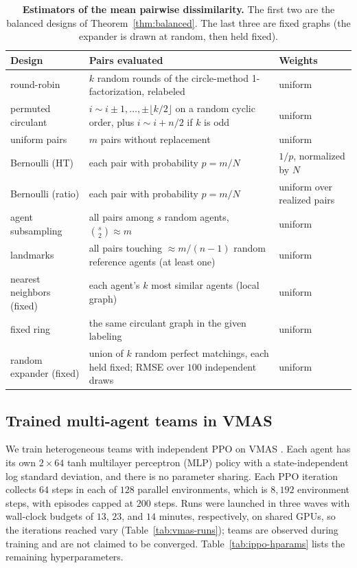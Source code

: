 \begin{table}[ht]
\centering
\small
\caption{\textbf{Estimators of the mean pairwise dissimilarity.} The first two are the
balanced designs of Theorem~\ref{thm:balanced}. The last three are fixed graphs (the expander is drawn at random, then held fixed).}
\label{tab:design-list}
\begin{tabular}{@{}>{\raggedright\arraybackslash}p{3.2cm}>{\raggedright\arraybackslash}p{7.6cm}>{\raggedright\arraybackslash}p{3.4cm}@{}}
\toprule
Design & Pairs evaluated & Weights \\
\midrule
round-robin & $k$ random rounds of the circle-method \mbox{1-factorization}, relabeled & uniform \\
permuted circulant & $i\sim i\pm1,\dots,\pm\lfloor k/2\rfloor$ on a random cyclic order, plus $i\sim i+n/2$ if $k$ is odd & uniform \\
uniform pairs & $m$ pairs without replacement & uniform \\
Bernoulli (HT) & each pair with probability $p=m/N$ & $1/p$, normalized by $N$ \\
Bernoulli (ratio) & each pair with probability $p=m/N$ & uniform over realized pairs \\
agent subsampling & all pairs among $s$ random agents, $\binom s2\approx m$ & uniform \\
landmarks & all pairs touching $\approx m/(n-1)$ random reference agents (at least one) & uniform \\
nearest neighbors (fixed) & each agent's $k$ most similar agents (local graph) & uniform \\
fixed ring & the same circulant graph in the given labeling & uniform \\
random expander (fixed) & union of $k$ random perfect matchings, each held fixed; RMSE over $100$ independent draws & uniform \\
\bottomrule
\end{tabular}
\end{table}

\subsection{Trained multi-agent teams in VMAS}
\label{app:exp-details:vmas}

We train heterogeneous teams with independent PPO on VMAS \citep{bettini2022vmas}.
Each agent has its own $2\times64$ tanh multilayer perceptron (MLP) policy with a state-independent
log standard deviation, and there is no parameter sharing. Each PPO iteration
collects $64$ steps in each of $128$ parallel environments, which is $8{,}192$
environment steps, with episodes capped at $200$ steps.
Runs were launched in three waves with wall-clock budgets of $13$, $23$, and
$14$ minutes, respectively, on shared GPUs, so the iterations reached vary
(Table~\ref{tab:vmas-runs}); teams are observed during training and are not
claimed to be converged. Table~\ref{tab:ippo-hparams} lists the remaining
hyperparameters.

